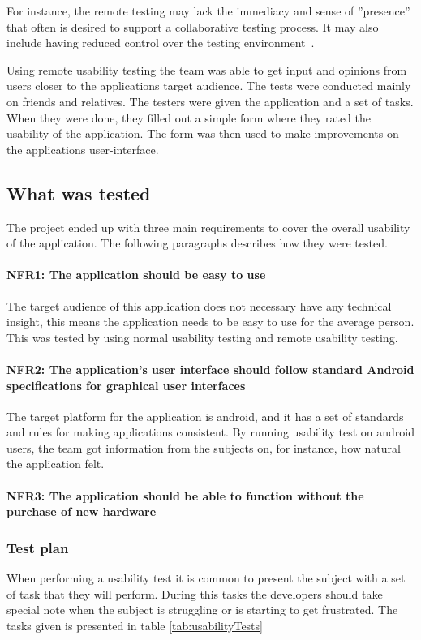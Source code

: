 For instance, the remote testing may lack the immediacy and sense of ''presence'' that often is desired to support a collaborative testing process. It may also include having reduced control over the testing environment~\cite{remoteTest}. 

Using remote usability testing the team was able to get input and opinions from users closer to the applications target audience.
The tests were conducted mainly on friends and relatives. The testers were given the application and a set of tasks. When they were done, they filled out a simple form where they rated the usability of the application. The form was then used to make improvements on the applications user-interface.

\subsection{What was tested}
The project ended up with three main requirements to cover the overall usability of the application. The following paragraphs describes how they were tested.

\paragraph{NFR1: The application should be easy to use}
The target audience of this application does not necessary have any technical insight, this means the application needs to be easy to use for the average person. This was tested by using normal usability testing and remote usability testing.

\paragraph{NFR2: The application's user interface should follow standard Android specifications for graphical user interfaces}
The target platform for the application is android, and it has a set of standards and rules for making applications consistent.
By running usability test on android users, the team got information from the subjects on, for instance, how natural the application felt.

\paragraph{NFR3: The application should be able to function without the purchase of new hardware}


\subsubsection{Test plan}
When performing a usability test it is common to present the subject with a set of task that they will perform. During this tasks the developers should take special note when the subject is struggling or is starting to get frustrated. The tasks given is presented in table \ref{tab:usabilityTests}

